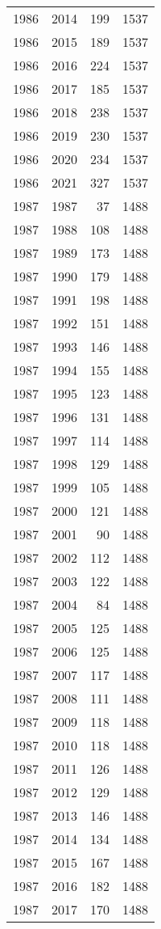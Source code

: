 \documentclass[
  10pt,
  letterpaper,
  DIV=11,
  numbers=noendperiod,
  twoside]{scrartcl}
\begin{document}
\begin{longtable}[]{@{}rrrr@{}}
1986 & 2014 & 199 & 1537 \\
1986 & 2015 & 189 & 1537 \\
1986 & 2016 & 224 & 1537 \\
1986 & 2017 & 185 & 1537 \\
1986 & 2018 & 238 & 1537 \\
1986 & 2019 & 230 & 1537 \\
1986 & 2020 & 234 & 1537 \\
1986 & 2021 & 327 & 1537 \\
1987 & 1987 & 37 & 1488 \\
1987 & 1988 & 108 & 1488 \\
1987 & 1989 & 173 & 1488 \\
1987 & 1990 & 179 & 1488 \\
1987 & 1991 & 198 & 1488 \\
1987 & 1992 & 151 & 1488 \\
1987 & 1993 & 146 & 1488 \\
1987 & 1994 & 155 & 1488 \\
1987 & 1995 & 123 & 1488 \\
1987 & 1996 & 131 & 1488 \\
1987 & 1997 & 114 & 1488 \\
1987 & 1998 & 129 & 1488 \\
1987 & 1999 & 105 & 1488 \\
1987 & 2000 & 121 & 1488 \\
1987 & 2001 & 90 & 1488 \\
1987 & 2002 & 112 & 1488 \\
1987 & 2003 & 122 & 1488 \\
1987 & 2004 & 84 & 1488 \\
1987 & 2005 & 125 & 1488 \\
1987 & 2006 & 125 & 1488 \\
1987 & 2007 & 117 & 1488 \\
1987 & 2008 & 111 & 1488 \\
1987 & 2009 & 118 & 1488 \\
1987 & 2010 & 118 & 1488 \\
1987 & 2011 & 126 & 1488 \\
1987 & 2012 & 129 & 1488 \\
1987 & 2013 & 146 & 1488 \\
1987 & 2014 & 134 & 1488 \\
1987 & 2015 & 167 & 1488 \\
1987 & 2016 & 182 & 1488 \\
1987 & 2017 & 170 & 1488 \\

\end{longtable}
\end{document}
